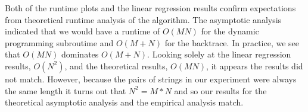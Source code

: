 \documentclass[10pt, onecolumn, draftclsnofoot, letterpaper, compsoc]{IEEEtran}
\begin{document}
Both of the runtime plots and the linear regression results confirm expectations from
theoretical runtime analysis of the algorithm. The asymptotic analysis indicated
that we would have a runtime of \begin{math}O(MN)\end{math} for the dynamic programming
subroutime and \begin{math}O(M+N)\end{math} for the backtrace. In practice, we
see that \begin{math}O(MN)\end{math} dominates \begin{math}O(M+N)\end{math}. Looking solely
at the linear regression results, \begin{math}O(N^2)\end{math}, and the theoretical
results, \begin{math}O(MN)\end{math}, it appears the results did not match.
However, because the pairs of strings in our experiment were always the same length it turns out that
\begin{math}N^2 = M*N\end{math} and so our results for the theoretical asymptotic
analysis and the empirical analysis match.
\end{document}

